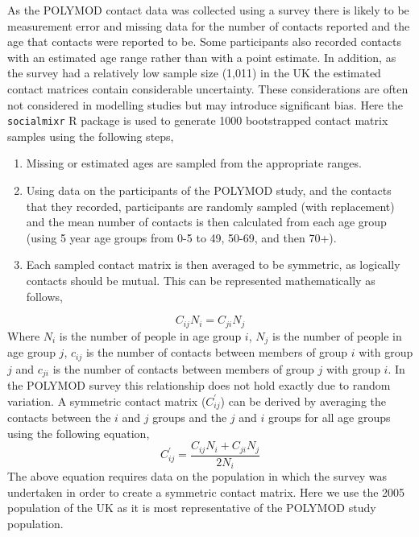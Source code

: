 \documentclass[11pt,twoside]{bristolthesis}
\begin{document}
  As the POLYMOD contact data was collected using a survey there is likely to be measurement error and missing data for the number of contacts reported and the age that contacts were reported to be. Some participants also recorded contacts with an estimated age range rather than with a point estimate. In addition, as the survey had a relatively low sample size (1,011) in the UK the estimated contact matrices contain considerable uncertainty. These considerations are often not considered in modelling studies but may introduce significant bias. Here the \texttt{socialmixr} R package is used to generate 1000 bootstrapped contact matrix samples using the following steps,
  \begin{enumerate}
  \def\labelenumi{\arabic{enumi}.}
  \item
    Missing or estimated ages are sampled from the appropriate ranges.
  \item
    Using data on the participants of the POLYMOD study, and the contacts that they recorded, participants are randomly sampled (with replacement) and the mean number of contacts is then calculated from each age group (using 5 year age groups from 0-5 to 49, 50-69, and then 70+).
  \item
    Each sampled contact matrix is then averaged to be symmetric, as logically contacts should be mutual. This can be represented mathematically as follows,
  \end{enumerate}
  \begin{equation} 
    C_{ij}N_i = C_{ji}N_j
    \label{eq:symmideal}
  \end{equation}
  Where \(N_i\) is the number of people in age group \(i\), \(N_j\) is the number of people in age group \(j\), \(c_{ij}\) is the number of contacts between members of group \(i\) with group \(j\) and \(c_{ji}\) is the number of contacts between members of group \(j\) with group \(i\). In the POLYMOD survey this relationship does not hold exactly due to random variation. A symmetric contact matrix (\(C^{\prime}_{ij}\)) can be derived by averaging the contacts between the \(i\) and \(j\) groups and the \(j\) and \(i\) groups for all age groups using the following equation,
  \begin{equation} 
    C^{\prime}_{ij} = \frac{C_{ij}N_i + C_{ji}N_j}{2N_i}
    \label{eq:symmfull}
  \end{equation}
  The above equation requires data on the population in which the survey was undertaken in order to create a symmetric contact matrix. Here we use the 2005 population of the UK as it is most representative of the POLYMOD study population.
  
\end{document}

